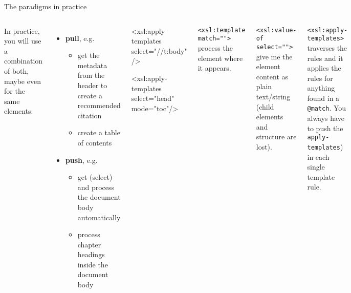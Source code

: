 \begin{frame}[fragile]{The paradigms in practice}
\small

\begin{columns}

In practice, you will use a combination of both, maybe even for the same elements:
\begin{itemize}
    \item \textbf{pull}, e.g. 
    \begin{itemize}\scriptsize
        \item get the metadata from the header to create a recommended citation 
        \item create a table of contents
    \end{itemize}
    \item \textbf{push}, e.g. 
    \begin{itemize}\scriptsize
        \item get (select) and process the document body automatically
        \item process chapter headings inside the document body
    \end{itemize}
\end{itemize}

\begin{xmlcode}
<xsl:apply templates 
  select="//t:body" />
  
<xsl:apply-templates 
  select="head" mode="toc"/>
\end{xmlcode}


\begin{block}{\texttt{<xsl:template match="">}} 
process the element where it appears.
\end{block}

\begin{block}{\texttt{<xsl:value-of select="">}}
give me the element content as plain text/string (child elements and structure are lost).
\end{block}

\begin{block}{\texttt{<xsl:apply-templates>}}
traverses the rules and it applies the rules for anything found in a \texttt{@match}. You always have to push the \texttt{apply-templates}) in each single template rule.
\end{block}
\end{columns}


\end{frame}


